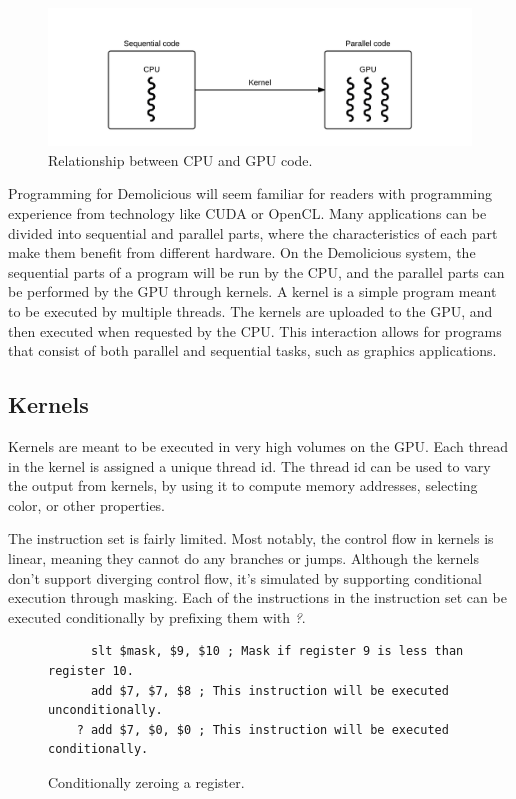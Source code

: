 \begin{figure}[H]
	\centering
	\includegraphics[width=\textwidth]{../system_overview/diagrams/programming_model_cpu_gpu.png}
	\caption{Relationship between CPU and GPU code.}
	\label{fig:programming_model_cpu_gpu}
\end{figure}
Programming for Demolicious will seem familiar for readers with programming experience from technology like CUDA or OpenCL. 
Many applications can be divided into sequential and parallel parts,
where the characteristics of each part make them benefit from different hardware.
On the Demolicious system, the sequential parts of a program will be run by the CPU, and the parallel parts can be performed by the GPU through kernels.
A kernel is a simple program meant to be executed by multiple threads.
The kernels are uploaded to the GPU, and then executed when requested by the CPU.
This interaction allows for programs that consist of both parallel and sequential tasks, such as graphics applications.

\subsection{Kernels}
Kernels are meant to be executed in very high volumes on the GPU.
Each thread in the kernel is assigned a unique thread id.
The thread id can be used to vary the output from kernels, 
by using it to compute memory addresses, selecting color, or other properties.

The instruction set is fairly limited.
Most notably, the control flow in kernels is linear, meaning they cannot do any branches or jumps.
Although the kernels don't support diverging control flow,
it's simulated by supporting conditional execution through masking.
Each of the instructions in the instruction set can be executed conditionally by prefixing them with \textit{?}.

\begin{figure}[H]
	\centering
	\begin{verbatim}
	  slt $mask, $9, $10 ; Mask if register 9 is less than register 10.
	  add $7, $7, $8 ; This instruction will be executed unconditionally.
	? add $7, $0, $0 ; This instruction will be executed conditionally.
	\end{verbatim}
	\caption{Conditionally zeroing a register.}
	\label{fig:conditional_execution}
\end{figure}

